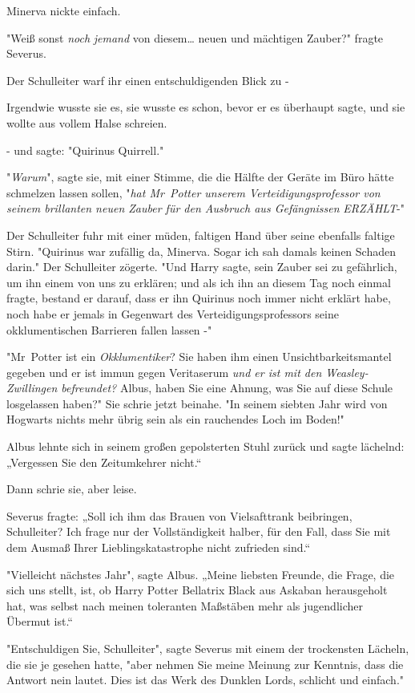 {Minerva nickte einfach.

"Weiß sonst \emph{noch} \emph{jemand} von diesem… neuen und mächtigen Zauber?" fragte Severus.

Der Schulleiter warf ihr einen entschuldigenden Blick zu -

Irgendwie wusste sie es, sie wusste es schon, bevor er es überhaupt sagte, und sie wollte aus vollem Halse schreien.

- und sagte: "Quirinus Quirrell."

"\emph{Warum}", sagte sie, mit einer Stimme, die die Hälfte der Geräte im Büro hätte schmelzen lassen sollen, "\emph{hat Mr~Potter unserem Verteidigungsprofessor von seinem brillanten neuen Zauber für den Ausbruch aus Gefängnissen} \emph{ERZÄHLT}-"

Der Schulleiter fuhr mit einer müden, faltigen Hand über seine ebenfalls faltige Stirn. "Quirinus war zufällig da, Minerva. Sogar ich sah damals keinen Schaden darin." Der Schulleiter zögerte. "Und Harry sagte, sein Zauber sei zu gefährlich, um ihn einem von uns zu erklären; und als ich ihn an diesem Tag noch einmal fragte, bestand er darauf, dass er ihn Quirinus noch immer nicht erklärt habe, noch habe er jemals in Gegenwart des Verteidigungsprofessors seine okklumentischen Barrieren fallen lassen -"

"Mr~Potter ist ein \emph{Okklumentiker}? Sie haben ihm einen Unsichtbarkeitsmantel gegeben und er ist immun gegen Veritaserum \emph{und er ist mit den Weasley-Zwillingen befreundet?} Albus, haben Sie eine Ahnung, was Sie auf diese Schule losgelassen haben?" Sie schrie jetzt beinahe. "In seinem siebten Jahr wird von Hogwarts nichts mehr übrig sein als ein rauchendes Loch im Boden!"

Albus lehnte sich in seinem großen gepolsterten Stuhl zurück und sagte lächelnd: „Vergessen Sie den Zeitumkehrer nicht.“

Dann schrie sie, aber leise.

Severus fragte: „Soll ich ihm das Brauen von Vielsafttrank beibringen, Schulleiter? Ich frage nur der Vollständigkeit halber, für den Fall, dass Sie mit dem Ausmaß Ihrer Lieblingskatastrophe nicht zufrieden sind.“

"Vielleicht nächstes Jahr", sagte Albus. „Meine liebsten Freunde, die Frage, die sich uns stellt, ist, ob Harry Potter Bellatrix Black aus Askaban herausgeholt hat, was selbst nach meinen toleranten Maßstäben mehr als jugendlicher Übermut ist.“

"Entschuldigen Sie, Schulleiter", sagte Severus mit einem der trockensten Lächeln, die sie je gesehen hatte, "aber nehmen Sie meine Meinung zur Kenntnis, dass die Antwort nein lautet. Dies ist das Werk des Dunklen Lords, schlicht und einfach."

}
